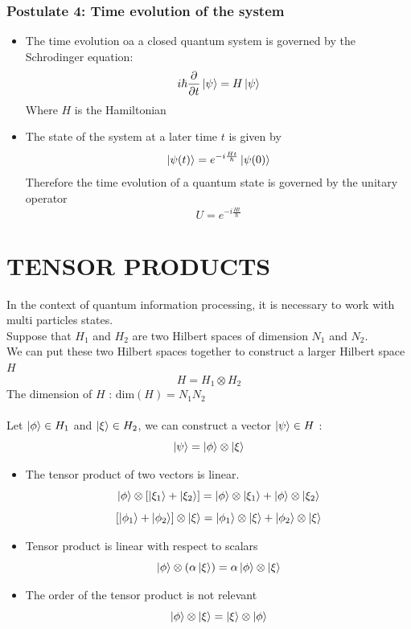 \documentclass[12pt,oneside]{book}
\begin{document}
\subsection{Postulate 4: Time evolution of the system}
\begin{itemize}
    \item The time evolution oa a closed quantum system is governed by the Schrodinger equation:
          \[ i\hbar \frac{\partial}{\partial t}\ket{\psi} = H\ket{\psi} \]
          Where $H$ is the Hamiltonian
    \item The state of the system at a later time $t$ is given by
          \[ \ket{\psi(t)} = e^{-i\frac{Ht}{\hbar}}\ket{\psi(0)} \]
          Therefore the time evolution of a quantum state is governed by the unitary operator
          \[ U = e^{-i\frac{Ht}{\hbar}} \]
\end{itemize}

\chapter{TENSOR PRODUCTS}
In the context of quantum information processing, it is necessary to work with multi particles states.\\
Suppose that $H_1$ and $H_2$ are two Hilbert spaces of dimension $N_1$ and $N_2$.\\
We can put these two Hilbert spaces together to construct a larger Hilbert space $H$
\[ H = H_1 \otimes H_2  \]
The dimension of $H$ : $ \text{dim}(H) = N_1N_2$\\\\
Let $\ket{\phi} \in H_1$ and $\ket{\xi} \in H_2 $, we can construct a vector $\ket{\psi} \in H$ :
\[\ket{\psi} = \ket{\phi} \otimes\ket{\xi}\]

\begin{itemize}
    \item The tensor product of two vectors is linear.
          \[\ket{\phi} \otimes [ \ket{\xi_1} + \ket{\xi_2} ] = \ket{\phi} \otimes \ket{\xi_1} + \ket{\phi} \otimes \ket{\xi_2}\]
          \[ [\ket{\phi_1} +\ket{\phi_2} ]\otimes \ket{\xi} = \ket{\phi_1}\otimes\ket{\xi} + \ket{\phi_2}\otimes\ket{\xi} \]
    \item Tensor product is linear with respect to scalars
          \[ \ket{\phi} \otimes (\alpha\ket{\xi}) = \alpha\ket{\phi} \otimes \ket{\xi} \]
    \item The order of the tensor product is not relevant
          \[ \ket{\phi} \otimes \ket{\xi} = \ket{\xi} \otimes \ket{\phi} \]
\end{itemize}
\end{document}
